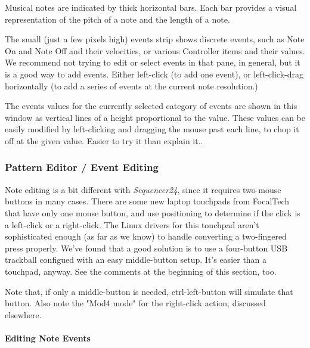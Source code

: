    Musical notes are indicated by thick horizontal bars.  Each bar provides
   a visual representation of the pitch of a note and the length of a note.

   The small (just a few pixels high) events strip shows discrete events,
   such as Note On and Note Off and their velocities, or various Controller
   items and their values.  We recommend not trying to edit or select events
   in that pane, in general, but it is a good way to add events.  Either
   left-click (to add one event), or left-click-drag horizontally (to add a
   series of events at the current note resolution.)

   The events values for the currently selected category of events are shown
   in this window as vertical lines of a height proportional to the value.
   These values can be easily modified by left-clicking and dragging the
   mouse past each line, to chop it off at the given value.  Easier to try
   it than explain it..

\subsubsection{Pattern Editor / Event Editing}
\label{subsubsec:seq24_pattern_editor_event_editing}

   Note editing is a bit different with \textsl{Sequencer24}, since it
   requires two mouse buttons in many cases.  There are some new
   laptop touchpads from FocalTech that have only one mouse button, and
   use positioning to determine if the click is a left-click or a right-click.
   The Linux drivers for this touchpad aren't sophisticated enough (as far
   as we know) to handle converting a two-fingered press properly.
   We've found that a good solution is to use a four-button USB trackball
   configued with an easy middle-button setup.
   It's easier than a touchpad, anyway.
   See the comments at the beginning of this section, too.

   Note that, if only a middle-button is needed, ctrl-left-button will
   simulate that button.  Also note the "Mod4 mode" for the right-click
   action, discussed elsewhere.

\paragraph{Editing Note Events}
\label{paragraph:seq24_pattern_editor_note_events}

